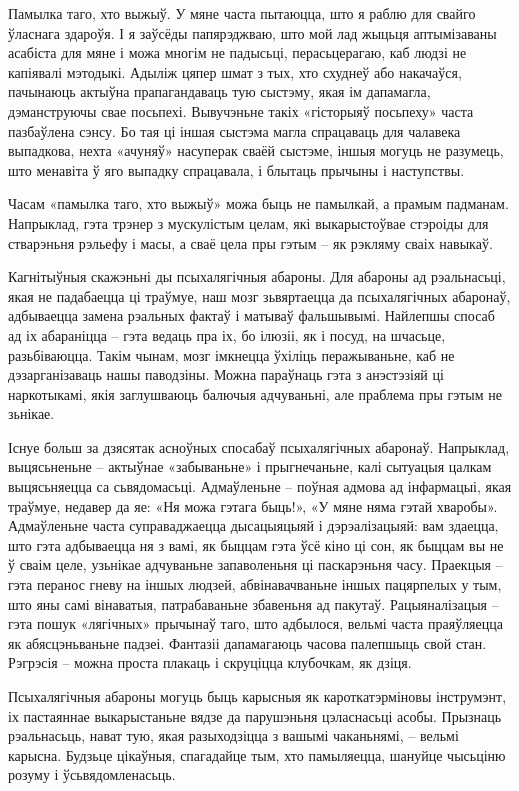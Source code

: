 Памылка таго, хто выжыў. У мяне часта пытаюцца, што я раблю для свайго ўласнага здароўя. І я заўсёды папярэджваю, што мой лад жыцьця аптымізаваны асабіста для мяне і можа многім не падысьці, перасьцерагаю, каб людзі не капіявалі мэтодыкі. Адыліж цяпер шмат з тых, хто схуднеў або накачаўся, пачынаюць актыўна прапагандаваць тую сыстэму, якая ім дапамагла, дэманструючы свае посьпехі. Вывучэньне такіх «гісторыяў посьпеху» часта пазбаўлена сэнсу. Бо тая ці іншая сыстэма магла спрацаваць для чалавека выпадкова, нехта «ачуняў» насуперак сваёй сыстэме, іншыя могуць не разумець, што менавіта ў яго выпадку спрацавала, і блытаць прычыны і наступствы.

Часам «памылка таго, хто выжыў» можа быць не памылкай, а прамым падманам. Напрыклад, гэта трэнер з мускулістым целам, які выкарыстоўвае стэроіды для стварэньня рэльефу і масы, а сваё цела пры гэтым – як рэкляму сваіх навыкаў.

Кагнітыўныя скажэньні ды псыхалягічныя абароны. Для абароны ад рэальнасьці, якая не падабаецца ці траўмуе, наш мозг зьвяртаецца да псыхалягічных абаронаў, адбываецца замена рэальных фактаў і матываў фальшывымі. Найлепшы спосаб ад іх абараніцца – гэта ведаць пра іх, бо ілюзіі, як і посуд, на шчасьце, разьбіваюцца. Такім чынам, мозг імкнецца ўхіліць перажываньне, каб не дэзарганізаваць нашы паводзіны. Можна параўнаць гэта з анэстэзіяй ці наркотыкамі, якія заглушваюць балючыя адчуваньні, але праблема пры гэтым не зьнікае.

Існуе больш за дзясятак асноўных спосабаў псыхалягічных абаронаў. Напрыклад, выцясьненьне – актыўнае «забываньне» і прыгнечаньне, калі сытуацыя цалкам выцясьняецца са сьвядомасьці. Адмаўленьне – поўная адмова ад інфармацыі, якая траўмуе, недавер да яе: «Ня можа гэтага быць!», «У мяне няма гэтай хваробы». Адмаўленьне часта суправаджаецца дысацыяцыяй і дэрэалізацыяй: вам здаецца, што гэта адбываецца ня з вамі, як быццам гэта ўсё кіно ці сон, як быццам вы не ў сваім целе, узьнікае адчуваньне запаволеньня ці паскарэньня часу. Праекцыя – гэта перанос гневу на іншых людзей, абвінавачваньне іншых пацярпелых у тым, што яны самі вінаватыя, патрабаваньне збавеньня ад пакутаў. Рацыяналізацыя – гэта пошук «лягічных» прычынаў таго, што адбылося, вельмі часта праяўляецца як абясцэньваньне падзеі. Фантазіі дапамагаюць часова палепшыць свой стан. Рэгрэсія – можна проста плакаць і скруціцца клубочкам, як дзіця.

Псыхалягічныя абароны могуць быць карысныя як кароткатэрміновы інструмэнт, іх пастаяннае выкарыстаньне вядзе да парушэньня цэласнасьці асобы. Прызнаць рэальнасьць, нават тую, якая разыходзіцца з вашымі чаканьнямі, – вельмі карысна. Будзьце цікаўныя, спагадайце тым, хто памыляецца, шануйце чысьціню розуму і ўсьвядомленасьць.

